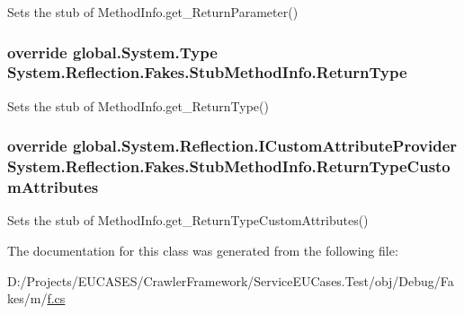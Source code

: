 Sets the stub of Method\-Info.\-get\-\_\-\-Return\-Parameter()

\hypertarget{class_system_1_1_reflection_1_1_fakes_1_1_stub_method_info_a7478ecc705665a090c4aa501a842a5ee}{
\subsubsection[{Return\-Type}]{\setlength{\rightskip}{0pt plus 5cm}override global.\-System.\-Type System.\-Reflection.\-Fakes.\-Stub\-Method\-Info.\-Return\-Type\hspace{0.3cm}{\ttfamily [get]}}}\label{class_system_1_1_reflection_1_1_fakes_1_1_stub_method_info_a7478ecc705665a090c4aa501a842a5ee}


Sets the stub of Method\-Info.\-get\-\_\-\-Return\-Type()

\hypertarget{class_system_1_1_reflection_1_1_fakes_1_1_stub_method_info_a80314d1e2d3558c5f4f2da9d249f73c8}{
\subsubsection[{Return\-Type\-Custom\-Attributes}]{\setlength{\rightskip}{0pt plus 5cm}override global.\-System.\-Reflection.\-I\-Custom\-Attribute\-Provider System.\-Reflection.\-Fakes.\-Stub\-Method\-Info.\-Return\-Type\-Custom\-Attributes\hspace{0.3cm}{\ttfamily [get]}}}\label{class_system_1_1_reflection_1_1_fakes_1_1_stub_method_info_a80314d1e2d3558c5f4f2da9d249f73c8}


Sets the stub of Method\-Info.\-get\-\_\-\-Return\-Type\-Custom\-Attributes()



The documentation for this class was generated from the following file\-:\begin{DoxyCompactItemize}
\item 
D\-:/\-Projects/\-E\-U\-C\-A\-S\-E\-S/\-Crawler\-Framework/\-Service\-E\-U\-Cases.\-Test/obj/\-Debug/\-Fakes/m/\hyperlink{m_2f_8cs}{f.\-cs}\end{DoxyCompactItemize}

